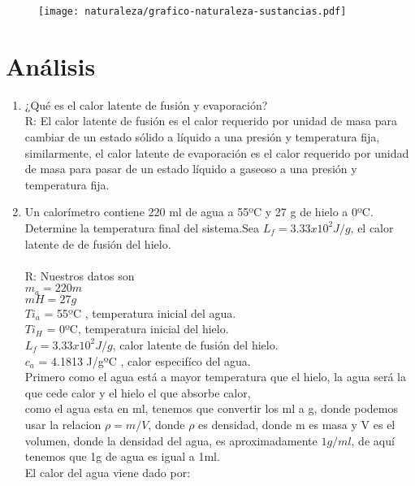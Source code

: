 \documentclass[a4paper, 12p]{article}
\begin{document}
\begin{figure}[H]
      \centering
      \texttt{[image: naturaleza/grafico-naturaleza-sustancias.pdf]}
      \label{img: naturaleza}
\end{figure}

\section{Análisis}
\begin{enumerate}
	\item ¿Qué es el calor latente de fusión y evaporación?\\
		  R: El calor latente de fusión es el calor requerido por unidad de masa para cambiar de un estado sólido a líquido a una presión y temperatura fija, similarmente, el calor latente de evaporación es el calor requerido por unidad de masa para pasar de un estado líquido a gaseoso a una presión y temperatura fija.\\
	\item Un calorímetro contiene 220 ml de agua a 55ºC y 27 g de hielo a 0ºC. Determine la temperatura final del sistema.Sea $L_{f} = 3.33x10^2 J/g$, el calor latente de de fusión del hielo.\\ \\
		  R: Nuestros datos son\\ 
		     $m_{a} = 220 m$\\
		     $m{H} = 27 g$\\
		     $Ti_a$ = 55ºC , temperatura inicial del agua. \\
		     $Ti_H$ = 0ºC, temperatura inicial del hielo. \\ 
		     $L_{f} = 3.33 x 10^2 J/g$, calor latente de fusión del hielo.\\
		     $c_{a}$ = 4.1813 J/gºC , calor especifíco del agua.\\
		     
		     Primero como el agua está a mayor temperatura que el hielo, la agua será la que cede calor y el hielo el que absorbe calor,\\ 
		     como el agua esta en ml, tenemos que convertir los ml a g, donde podemos usar la relacion $\rho = m/V$, donde $\rho$ es densidad, donde m es masa y V es el volumen, donde la densidad del agua, es aproximadamente $1g/ml$, de aquí tenemos que 1g de agua es igual a 1ml.\\
		     El calor del agua viene dado por:\\
		      

\end{enumerate}
\end{document}
